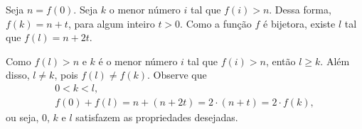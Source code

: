Seja $n = f(0)$. Seja $k$ o menor número $i$ tal que $f(i) > n$. Dessa forma, $f(k) = n + t$, para algum inteiro $t > 0$. Como a função $f$ é bijetora, existe $l$ tal que $f(l) = n + 2t$.

Como $f(l) > n$ e $k$ é o menor número $i$ tal que $f(i) > n$, então $l \ge k$. Além disso, $l \neq k$, pois $f(l) \neq f(k)$. Observe que
\begin{gather*}
	0 < k < l, \\
	f(0) + f(l) = n + (n + 2t) = 2 \cdot (n+t) = 2 \cdot f(k), 
\end{gather*}
ou seja, $0$, $k$ e $l$ satisfazem as propriedades desejadas.
